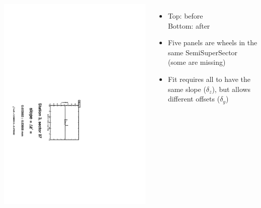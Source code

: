 \documentclass[compress]{beamer}
\begin{document}
\begin{frame}
\begin{columns}
\vfill
\includegraphics[height=\linewidth, angle=90]{zfits_after/zfit_3_07.pdf}
\begin{itemize}
\item Top: before \\ Bottom: after
\item Five panels are wheels in the same SemiSuperSector (some are missing)
\item Fit requires all to have the same slope ($\delta_z$), but allows different offsets ($\delta_y$)
\end{itemize}
\end{columns}
\end{frame}
\end{document}
